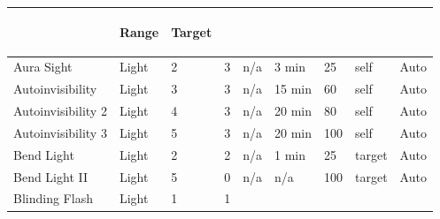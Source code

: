\documentclass[twoside]{book}
\begin{document}
\begin{longtable}{p{1.25in}lp{2em}p{3em}llp{7em}ll}
  &
  \begin{turn}{70}{Range}\end{turn}
          
  &
  \begin{turn}{70}{Target}\end{turn}
          
  \\
  \hline
  \endhead
      
  \raggedright
           Aura Sight 
  &
   Light 
  &
   2 
  &
   3
           
  &
   n/a 
  &
   3 min
           
  &
   25
           
  &
   self 
  &
   Auto 
  \tabularnewline
      
  \raggedright
           Autoinvisibility 
  &
   Light 
  &
   3 
  &
   3
           
  &
   n/a 
  &
   15 min
           
  &
   60
           
  &
   self 
  &
   Auto 
  \tabularnewline
      
  \raggedright
           Autoinvisibility 2 
  &
   Light 
  &
   4 
  &
   3
           
  &
   n/a 
  &
   20 min
           
  &
   80
           
  &
   self 
  &
   Auto 
  \tabularnewline
      
  \raggedright
           Autoinvisibility 3 
  &
   Light 
  &
   5 
  &
   3
           
  &
   n/a 
  &
   20 min
           
  &
   100
           
  &
   self 
  &
   Auto 
  \tabularnewline
      
  \raggedright
           Bend Light 
  &
   Light 
  &
   2 
  &
   2
           
  &
   n/a 
  &
   1 min
           
  &
   25
           
  &
   target 
  &
   Auto 
  \tabularnewline
      
  \raggedright
           Bend Light II 
  &
   Light 
  &
   5 
  &
   0
           
  &
   n/a 
  &
   n/a 
  &
   100
           
  &
   target 
  &
   Auto 
  \tabularnewline
      
  \raggedright
           Blinding Flash 
  &
   Light 
  &
   1 
  &
   1
           

\end{longtable}
\end{document}
